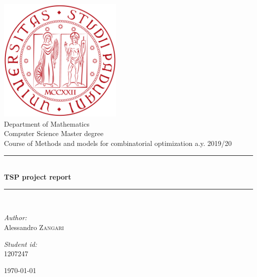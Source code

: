 \documentclass[a4paper,12pt]{article}
\theoremstyle{break}
\begin{document}

\begin{titlepage}
\thispagestyle{empty}
\begin{center}
	

\includegraphics[width=0.45\textwidth]{logo-unipd}\\[1cm]

{\large Department of Mathematics}\\[0.5cm]

{\large Computer Science Master degree}\\[0.5cm]

{\large Course of Methods and models for combinatorial optimization a.y. 2019/20}\\[0.5cm]


\rule{\linewidth}{0.5mm} \\[0.4cm]
{ \huge \bfseries TSP project report \\[0.4cm] }
\rule{\linewidth}{0.5mm} \\[1.5cm]

\noindent
\begin{minipage}{0.4\textwidth}
  \begin{flushleft} \large
    \emph{Author:}\\
    Alessandro \textsc{Zangari}
  \end{flushleft}
\end{minipage}%
\begin{minipage}{0.4\textwidth}
  \begin{flushright} \large
    \emph{Student id:} \\
    \textsc{1207247}
  \end{flushright}
\end{minipage}

\vfill

{\today}

\end{center}
\end{titlepage}
\end{document}
